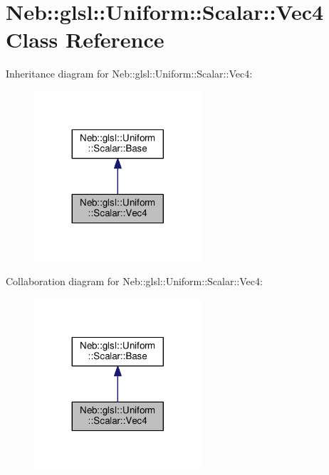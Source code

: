 \hypertarget{classNeb_1_1glsl_1_1Uniform_1_1Scalar_1_1Vec4}{\section{Neb\-:\-:glsl\-:\-:Uniform\-:\-:Scalar\-:\-:Vec4 Class Reference}
\label{classNeb_1_1glsl_1_1Uniform_1_1Scalar_1_1Vec4}
}


Inheritance diagram for Neb\-:\-:glsl\-:\-:Uniform\-:\-:Scalar\-:\-:Vec4\-:
\nopagebreak
\begin{figure}[H]
\begin{center}
\leavevmode
\includegraphics[width=176pt]{classNeb_1_1glsl_1_1Uniform_1_1Scalar_1_1Vec4__inherit__graph}
\end{center}
\end{figure}


Collaboration diagram for Neb\-:\-:glsl\-:\-:Uniform\-:\-:Scalar\-:\-:Vec4\-:
\nopagebreak
\begin{figure}[H]
\begin{center}
\leavevmode
\includegraphics[width=176pt]{classNeb_1_1glsl_1_1Uniform_1_1Scalar_1_1Vec4__coll__graph}
\end{center}
\end{figure}
